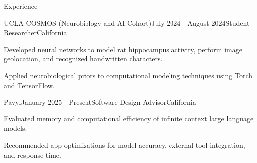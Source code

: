 \documentclass[
  10pt, %
]{resume}
\begin{document}
\begin{rSection}{Experience}
  \begin{rSubsection}{UCLA COSMOS (Neurobiology and AI Cohort)}{July 2024 - August 2024}{Student Researcher}{California}
    
    \item Developed neural networks to model rat hippocampus activity, perform image geolocation, and recognized handwritten characters.
    
    \item Applied neurobiological priors to computational modeling techniques using Torch and TensorFlow.
    
  \end{rSubsection}
        
  \begin{rSubsection}{Pavyl}{January 2025 - Present}{Software Design Advisor}{California}
    
    \item Evaluated memory and computational efficiency of infinite context large language models.
    
    \item Recommended app optimizations for model accuracy, external tool integration, and response time.
    
  \end{rSubsection}
        
	
\end{rSection}

\end{document}
